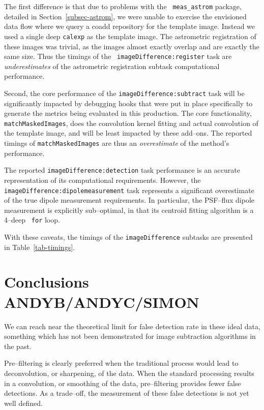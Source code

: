 \documentclass[prd, nofootinbib, floatfix, 11pt,tightenlines,times]{article}
\begin{document}
The first difference is that due to problems with the {\tt
  meas\_astrom} package, detailed in Section~\ref{subsec-astrom}, we
were unable to exercise the envisioned data flow where we query a
coadd repository for the template image.  Instead we used a single
deep {\tt calexp} as the template image.  The astrometric registration
of these images was trivial, as the images almost exactly overlap and
are exactly the same size.  Thus the timings of the {\tt
  imageDifference:register} task are {\it underestimates} of the
astrometric registration subtask computational performance.

Second, the core performance of the {\tt imageDifference:subtract}
task will be significantly impacted by debugging hooks that were put
in place specifically to generate the metrics being evaluated in this
production.  The core functionality, {\tt matchMaskedImages}, does the
convolution kernel fitting and actual convolution of the template
image, and will be least impacted by these add--ons.  The reported
timings of {\tt matchMaskedImages} are thus an {\it overestimate} of
the method's performance.

The reported {\tt imageDifference:detection} task performance is an
accurate representation of its computational requirements.  However,
the {\tt imageDifference:dipolemeasurement} task represents a
significant overestimate of the true dipole measurement requirements.
In particular, the PSF--flux dipole measurement is explicitly
sub--optimal, in that its centroid fitting algorithm is a 4--deep {\tt
  for} loop.

With these caveats, the timings of the {\tt imageDifference} subtasks
are presented in Table~\ref{tab-timings}.

\section{Conclusions {\bf ANDYB/ANDYC/SIMON}}

We can reach near the theoretical limit for false detection rate in
these ideal data, something which has not been demonstrated for image
subtraction algorithms in the past.

Pre--filtering is clearly preferred when the traditional process would
lead to deconvolution, or sharpening, of the data.  When the standard
processing results in a convolution, or smoothing of the data,
pre--filtering provides fewer false detections.  As a trade--off, the
measurement of these false detections is not yet well defined.
\end{document}

